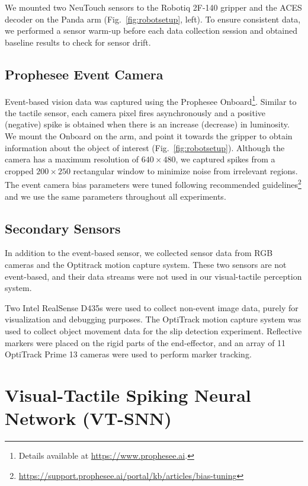 \documentclass[fyp]{socreport}
\begin{document}
We mounted two NeuTouch sensors to the Robotiq 2F-140 gripper and the ACES
decoder on the Panda arm (Fig.~\ref{fig:robotsetup}, left). To ensure consistent
data, we performed a sensor warm-up before each data collection session and
obtained baseline results to check for sensor drift.

\section{Prophesee Event Camera}
Event-based vision data was captured using the Prophesee
Onboard\footnote{Details available at \url{https://www.prophesee.ai}.}. Similar
to the tactile sensor, each camera pixel fires asynchronously and a positive
(negative) spike is obtained when there is an increase (decrease) in luminosity.
We mount the Onboard on the arm, and point it towards the gripper to obtain
information about the object of interest (Fig.~\ref{fig:robotsetup}). Although
the camera has a maximum resolution of $640 \times 480$, we captured spikes from
a cropped $200 \times 250$ rectangular window to minimize noise from irrelevant
regions. The event camera bias parameters were tuned following recommended
guidelines\footnote{\url{https://support.prophesee.ai/portal/kb/articles/bias-tuning}}
and we use the same parameters throughout all experiments.

\section{Secondary Sensors}

In addition to the event-based sensor, we collected sensor data from RGB cameras
and the Optitrack motion capture system. These two sensors are not event-based,
and their data streams were not used in our visual-tactile perception system.

Two Intel RealSense D435s were used to collect non-event image data, purely for
visualization and debugging purposes. The OptiTrack motion capture system was
used to collect object movement data for the slip detection experiment.
Reflective markers were placed on the rigid parts of the end-effector, and an
array of 11 OptiTrack Prime 13 cameras were used to perform marker tracking.

\chapter{Visual-Tactile Spiking Neural Network (VT-SNN)\label{cha:vtsnn}}
\end{document}

